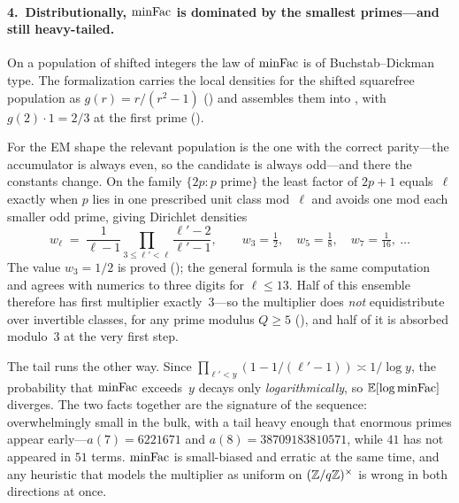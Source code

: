 \paragraph{4.\ Distributionally, $\mathrm{minFac}$ is dominated by the smallest
primes---and still heavy-tailed.}
On a population of shifted integers the law of $\mathrm{minFac}$ is of
Buchstab--Dickman type.  The formalization carries the local densities
for the shifted squarefree population as
$g(r) = r/(r^2-1)$ ()
and assembles them into
, with
$g(2) \cdot 1 = 2/3$ at the first prime
().

For the EM shape the relevant population is the one with the correct
parity---the accumulator is always even, so the candidate is always
odd---and there the constants change.  On the family $\{2p : p$ prime$\}$
the least factor of $2p+1$ equals~$\ell$ exactly when $p$ lies in one
prescribed unit class mod~$\ell$ and avoids one mod each smaller odd
prime, giving Dirichlet densities
\[
  w_\ell \;=\; \frac{1}{\ell-1}\prod_{3 \leq \ell' < \ell}
    \frac{\ell'-2}{\ell'-1},
  \qquad
  w_3 = \tfrac12,\quad w_5 = \tfrac18,\quad w_7 = \tfrac1{16},\ \dots
\]
The value $w_3 = 1/2$ is proved
();
the general formula is the same computation and agrees with numerics to
three digits for $\ell \leq 13$.  Half of this ensemble therefore has
first multiplier exactly~$3$---so the multiplier does \emph{not}
equidistribute over invertible classes, for any prime modulus
$Q \geq 5$
(),
and half of it is absorbed modulo~$3$ at the very first step.

The tail runs the other way.  Since
$\prod_{\ell' < y}(1 - 1/(\ell'-1)) \asymp 1/\log y$, the probability
that $\mathrm{minFac}$ exceeds~$y$ decays only \emph{logarithmically}, so
$\mathbb{E}[\log \mathrm{minFac}]$ diverges.  The two facts together are the
signature of the sequence: overwhelmingly small in the bulk, with a tail
heavy enough that enormous primes appear early---$a(7) = 6221671$ and
$a(8) = 38709183810571$, while $41$ has not appeared in $51$ terms.
$\mathrm{minFac}$ is small-biased and erratic at the same time, and any
heuristic that models the multiplier as uniform on
$(\mathbb{Z}/q\mathbb{Z})^\times$ is wrong in both directions at once.


